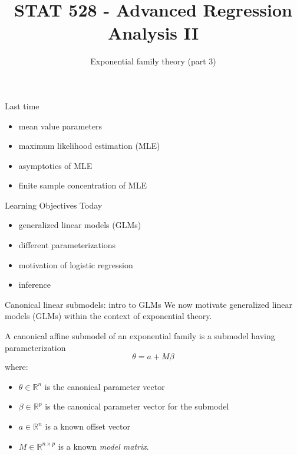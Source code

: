 \documentclass[
  ignorenonframetext,
]{beamer}
\title{STAT 528 - Advanced Regression Analysis II}
\author{Exponential family theory (part 3)}
\date{}
\institute{Daniel J. Eck\\
Department of Statistics\\
University of Illinois}
\providecommand{\tightlist}{%
  \setlength{\itemsep}{0pt}\setlength{\parskip}{0pt}}
\begin{document}
\frame{\titlepage}

\begin{frame}
\newcommand{\R}{\mathbb{R}}
\newcommand{\Prob}{\mathbb{P}}
\newcommand{\Proj}{\textbf{P}}
\newcommand{\Hcal}{\mathcal{H}}
\newcommand{\rootn}{\sqrt{n}}
\newcommand{\p}{\mathbf{p}}
\newcommand{\E}{\text{E}}
\newcommand{\Var}{\text{Var}}
\newcommand{\Cov}{\text{Cov}}

\newtheorem{cor}{Corollary}
\newtheorem{lem}{Lemma}
\newtheorem{thm}{Theorem}
\newtheorem{defn}{Definition}
\newtheorem{prop}{Proposition}
\end{frame}

\begin{frame}{Last time}
\protect\hypertarget{last-time}{}
\begin{itemize}
\tightlist
\item
  mean value parameters
\item
  maximum likelihood estimation (MLE)
\item
  asymptotics of MLE
\item
  finite sample concentration of MLE
\end{itemize}
\end{frame}

\begin{frame}{Learning Objectives Today}
\protect\hypertarget{learning-objectives-today}{}
\begin{itemize}
\tightlist
\item
  generalized linear models (GLMs)
\item
  different parameterizations
\item
  motivation of logistic regression
\item
  inference
\end{itemize}
\end{frame}

\begin{frame}{Canonical linear submodels: intro to GLMs}
\protect\hypertarget{canonical-linear-submodels-intro-to-glms}{}
We now motivate generalized linear models (GLMs) within the context of
exponential theory.

A canonical affine submodel of an exponential family is a submodel
having parameterization \[
  \theta = a + M\beta
\] where:

\begin{itemize}
\tightlist
\item
  \(\theta \in \mathbb{R}^n\) is the canonical parameter vector
\item
  \(\beta \in \mathbb{R}^p\) is the canonical parameter vector for the
  submodel
\item
  \(a \in \mathbb{R}^n\) is a known offset vector
\item
  \(M \in \mathbb{R}^{n\times p}\) is a known \emph{model matrix}.
\end{itemize}
\end{frame}
\end{document}
